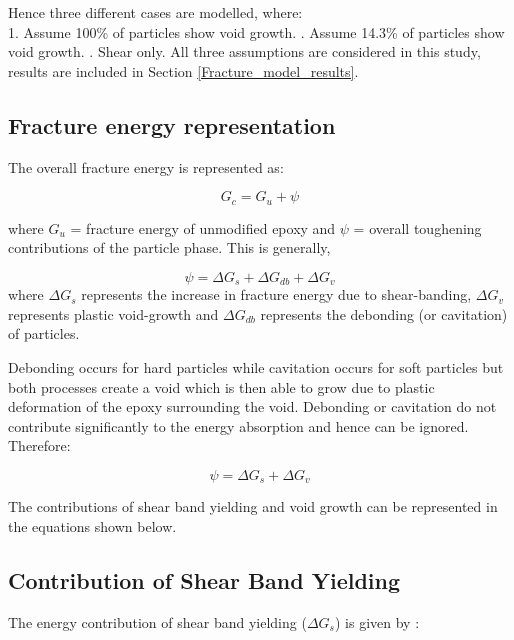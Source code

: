 \documentclass[numbers=noendperiod,chapterprefix=on]{icldt} %
\begin{document}
Hence three different cases are modelled, where:
\\
1.	Assume 100\% of particles show void growth. 
.	Assume 14.3\% of particles show void growth. 
.	Shear only. 
\newline
All three assumptions are considered in this study, results are included in Section \ref{Fracture_model_results}.

\subsection{Fracture energy representation}

The overall fracture energy is represented as:

\begin{equation} 
G_c= G_u+\psi
\end{equation}

where $G_u$ = fracture energy of unmodified epoxy and $\psi$ = overall toughening contributions of the particle phase. This is generally,
 
\begin{equation} 
\psi=\Delta G_s+\Delta G_{db}+\Delta G_v
\end{equation}
where $\Delta G_s$ represents the increase in fracture energy due to shear-banding, $\Delta G_v$ represents plastic void-growth and $\Delta G_{db}$ represents the debonding (or cavitation) of particles.

Debonding occurs for hard particles while cavitation occurs for soft particles \cite{Hsieh2010a,Hsieh2010,Giannakopoulos2011} but both processes create a void which is then able to grow due to plastic deformation of the epoxy surrounding the void. Debonding or cavitation do not contribute significantly to the energy absorption \cite{Hsieh2010a,Hsieh2010,Giannakopoulos2011} and hence can be ignored. Therefore:

\begin{equation} 
\psi=\Delta G_s+\Delta G_v
\end{equation}

The contributions of shear band yielding and void growth can be represented in the equations \cite{Hsieh2010a,Hsieh2010,Giannakopoulos2011} shown below. 

\subsection{Contribution of Shear Band Yielding}
The energy contribution of shear band yielding ($\Delta G_s$) is given by \cite{Chen2013}: 
\end{document}
